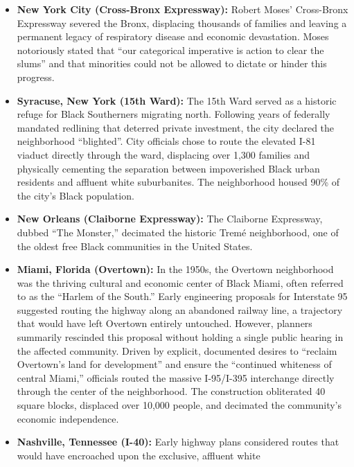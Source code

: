 \documentclass[
]{article}
\providecommand{\tightlist}{%
  \setlength{\itemsep}{0pt}\setlength{\parskip}{0pt}}
\begin{document}
\begin{itemize}
\tightlist
\item
  \textbf{New York City (Cross-Bronx Expressway):} Robert Moses'
  Cross-Bronx Expressway severed the Bronx, displacing thousands of
  families and leaving a permanent legacy of respiratory disease and
  economic devastation. Moses notoriously stated that ``our categorical
  imperative is action to clear the slums'' and that minorities could
  not be allowed to dictate or hinder this progress.\\
\item
  \textbf{Syracuse, New York (15th Ward):} The 15th Ward served as a
  historic refuge for Black Southerners migrating north. Following years
  of federally mandated redlining that deterred private investment, the
  city declared the neighborhood ``blighted''. City officials chose to
  route the elevated I-81 viaduct directly through the ward, displacing
  over 1,300 families and physically cementing the separation between
  impoverished Black urban residents and affluent white suburbanites.
  The neighborhood housed 90\% of the city's Black population.\\
\item
  \textbf{New Orleans (Claiborne Expressway):} The Claiborne
  Expressway, dubbed ``The Monster,'' decimated the historic Tremé
  neighborhood, one of the oldest free Black communities in the United
  States.\\
\item
  \textbf{Miami, Florida (Overtown):} In the 1950s, the Overtown
  neighborhood was the thriving cultural and economic center of Black
  Miami, often referred to as the ``Harlem of the South.'' Early
  engineering proposals for Interstate 95 suggested routing the highway
  along an abandoned railway line, a trajectory that would have left
  Overtown entirely untouched. However, planners summarily rescinded
  this proposal without holding a single public hearing in the affected
  community. Driven by explicit, documented desires to ``reclaim
  Overtown's land for development'' and ensure the ``continued whiteness
  of central Miami,'' officials routed the massive I-95/I-395
  interchange directly through the center of the neighborhood. The
  construction obliterated 40 square blocks, displaced over 10,000
  people, and decimated the community's economic independence.\\
\item
  \textbf{Nashville, Tennessee (I-40):} Early highway plans considered
  routes that would have encroached upon the exclusive, affluent white

\end{itemize}
\end{document}
